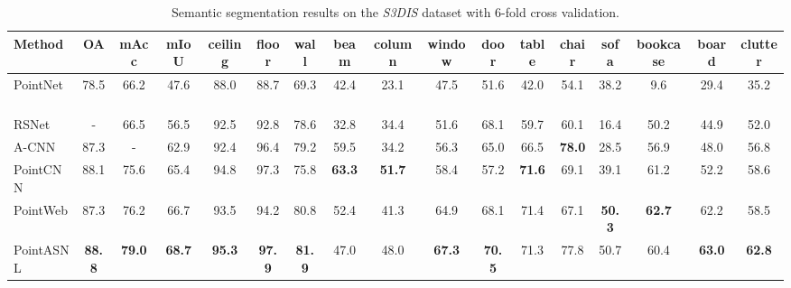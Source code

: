 \documentclass[10pt,twocolumn,letterpaper]{article}
\begin{document}
	\begin{table*}[!htp]
		\renewcommand\tabcolsep{2.5pt} 
		\caption{Semantic segmentation results on the \textit{S3DIS} dataset with 6-fold cross validation.}
		\begin{center}
			\begin{tabular}{l|ccc|ccccccccccccc}
				\hline
				
				Method& OA &mAcc& mIoU& ceiling &floor& wall& beam& column& window& door& table&  chair &sofa &bookcase& board& clutter \\
				\hline
				\hline
				
				PointNet~\cite{pointnet} &78.5 &66.2 &47.6 &88.0& 88.7 &69.3 &42.4 &23.1& 47.5 &51.6& 42.0 &54.1& 38.2 &9.6& 29.4& 35.2\\
				RSNet~\cite{RSNet}& -&66.5& 56.5 &92.5 &92.8& 78.6& 32.8& 34.4& 51.6 &68.1 &59.7& 60.1 &16.4 &50.2& 44.9& 52.0\\
				A-CNN~\cite{acnn}&87.3&-& 62.9& 92.4 &96.4 &79.2& 59.5 &34.2 &56.3& 65.0& 66.5& \bf{78.0} &28.5 &56.9& 48.0& 56.8\\
				PointCNN~\cite{PointCNN} &88.1 &75.6& 65.4 &94.8& 97.3& 75.8 &\bf{63.3} &\bf{51.7} &58.4 &57.2 &\bf{71.6} &69.1& 39.1& 61.2& 52.2& 58.6\\
				PointWeb~\cite{PointWeb}&87.3 &76.2 &66.7& 93.5& 94.2& 80.8 &52.4& 41.3 &{64.9} &68.1 &71.4 &67.1& \bf{50.3}& \bf{62.7} &{62.2}& 58.5\\
				\hline
				PointASNL & \bf{88.8}&\bf{79.0}&\bf{68.7}&	\bf{95.3}&\bf{97.9}&	\bf{81.9}&	47.0&	48.0&	\bf{67.3}&	\bf{70.5}	&{71.3}	&77.8	&50.7	&60.4	&\bf{63.0}	&\bf{62.8} \\
				\hline
			\end{tabular}
		\end{center}
		\label{tab:S3DIS_6F}
	\end{table*}
	
\end{document}
